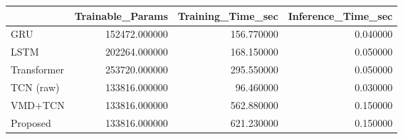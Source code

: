 \begin{tabular}{lrrr}
\toprule
 & Trainable_Params & Training_Time_sec & Inference_Time_sec \\
\midrule
GRU & 152472.000000 & 156.770000 & 0.040000 \\
LSTM & 202264.000000 & 168.150000 & 0.050000 \\
Transformer & 253720.000000 & 295.550000 & 0.050000 \\
TCN (raw) & 133816.000000 & 96.460000 & 0.030000 \\
VMD+TCN & 133816.000000 & 562.880000 & 0.150000 \\
Proposed & 133816.000000 & 621.230000 & 0.150000 \\
\bottomrule
\end{tabular}
